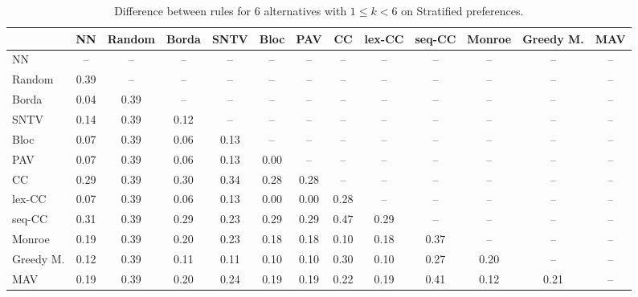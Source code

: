 
\begin{table*}[htbp]
\centering
\begin{tabular}{lcccccccccccc}
\toprule
 & NN & Random & Borda & SNTV & Bloc & PAV & CC & lex-CC & seq-CC & Monroe & Greedy M. & MAV \\
\midrule
NN & -- & -- & -- & -- & -- & -- & -- & -- & -- & -- & -- & -- \\
Random & \cellcolor{blue!39} 0.39 & -- & -- & -- & -- & -- & -- & -- & -- & -- & -- & -- \\
Borda & \cellcolor{blue!4} 0.04 & \cellcolor{blue!39} 0.39 & -- & -- & -- & -- & -- & -- & -- & -- & -- & -- \\
SNTV & \cellcolor{blue!14} 0.14 & \cellcolor{blue!39} 0.39 & \cellcolor{blue!12} 0.12 & -- & -- & -- & -- & -- & -- & -- & -- & -- \\
Bloc & \cellcolor{blue!7} 0.07 & \cellcolor{blue!39} 0.39 & \cellcolor{blue!6} 0.06 & \cellcolor{blue!13} 0.13 & -- & -- & -- & -- & -- & -- & -- & -- \\
PAV & \cellcolor{blue!7} 0.07 & \cellcolor{blue!39} 0.39 & \cellcolor{blue!6} 0.06 & \cellcolor{blue!13} 0.13 & \cellcolor{blue!0} 0.00 & -- & -- & -- & -- & -- & -- & -- \\
CC & \cellcolor{blue!28} 0.29 & \cellcolor{blue!39} 0.39 & \cellcolor{blue!30} 0.30 & \cellcolor{blue!34} 0.34 & \cellcolor{blue!28} 0.28 & \cellcolor{blue!28} 0.28 & -- & -- & -- & -- & -- & -- \\
lex-CC & \cellcolor{blue!7} 0.07 & \cellcolor{blue!39} 0.39 & \cellcolor{blue!6} 0.06 & \cellcolor{blue!13} 0.13 & \cellcolor{blue!0} 0.00 & \cellcolor{blue!0} 0.00 & \cellcolor{blue!28} 0.28 & -- & -- & -- & -- & -- \\
seq-CC & \cellcolor{blue!31} 0.31 & \cellcolor{blue!39} 0.39 & \cellcolor{blue!28} 0.29 & \cellcolor{blue!23} 0.23 & \cellcolor{blue!28} 0.29 & \cellcolor{blue!28} 0.29 & \cellcolor{blue!47} 0.47 & \cellcolor{blue!28} 0.29 & -- & -- & -- & -- \\
Monroe & \cellcolor{blue!19} 0.19 & \cellcolor{blue!39} 0.39 & \cellcolor{blue!20} 0.20 & \cellcolor{blue!23} 0.23 & \cellcolor{blue!18} 0.18 & \cellcolor{blue!18} 0.18 & \cellcolor{blue!10} 0.10 & \cellcolor{blue!18} 0.18 & \cellcolor{blue!37} 0.37 & -- & -- & -- \\
Greedy M. & \cellcolor{blue!12} 0.12 & \cellcolor{blue!39} 0.39 & \cellcolor{blue!11} 0.11 & \cellcolor{blue!11} 0.11 & \cellcolor{blue!10} 0.10 & \cellcolor{blue!10} 0.10 & \cellcolor{blue!30} 0.30 & \cellcolor{blue!10} 0.10 & \cellcolor{blue!27} 0.27 & \cellcolor{blue!20} 0.20 & -- & -- \\
MAV & \cellcolor{blue!19} 0.19 & \cellcolor{blue!39} 0.39 & \cellcolor{blue!20} 0.20 & \cellcolor{blue!24} 0.24 & \cellcolor{blue!19} 0.19 & \cellcolor{blue!19} 0.19 & \cellcolor{blue!22} 0.22 & \cellcolor{blue!19} 0.19 & \cellcolor{blue!41} 0.41 & \cellcolor{blue!12} 0.12 & \cellcolor{blue!21} 0.21 & -- \\
\bottomrule
\end{tabular}

\caption{Difference between rules for 6 alternatives with $1 \leq k < 6$ on Stratified preferences.}
\label{tab:rule_distance_heatmap-m=[6]-pref_dist=stratification__args__weight=0.5}
\end{table*}
    
